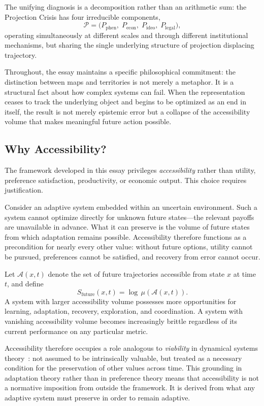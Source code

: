 \documentclass[12pt, a4paper]{article}
\theoremstyle{plain}
\theoremstyle{definition}
\theoremstyle{remark}
\begin{document}
The unifying diagnosis is a decomposition rather than an arithmetic sum: the
Projection Crisis has four irreducible components,
\[
\mathcal{P} = \bigl(P_{\mathrm{phen}},\; P_{\mathrm{econ}},\; P_{\mathrm{ideo}},\; P_{\mathrm{legal}}\bigr),
\]
operating simultaneously at different scales and through different institutional
mechanisms, but sharing the single underlying structure of projection displacing trajectory.

Throughout, the essay maintains a specific philosophical commitment:
the distinction between maps and territories is not merely a metaphor.
It is a structural fact about how complex systems can fail.
When the representation ceases to track the underlying object and begins to
be optimized as an end in itself, the result is not merely epistemic error
but a collapse of the accessibility volume that makes meaningful future action possible.

\subsection*{Why Accessibility?}

The framework developed in this essay privileges \emph{accessibility} rather than
utility, preference satisfaction, productivity, or economic output.
This choice requires justification.

Consider an adaptive system embedded within an uncertain environment.
Such a system cannot optimize directly for unknown future states---the relevant
payoffs are unavailable in advance.
What it can preserve is the volume of future states from which adaptation remains
possible.
Accessibility therefore functions as a precondition for nearly every other value:
without future options, utility cannot be pursued, preferences cannot be satisfied,
and recovery from error cannot occur.

Let $\mathcal{A}(x,t)$ denote the set of future trajectories accessible from
state $x$ at time $t$, and define
\[
S_{\mathrm{future}}(x,t) = \log\,\mu(\mathcal{A}(x,t)).
\]
A system with larger accessibility volume possesses more opportunities for learning,
adaptation, recovery, exploration, and coordination.
A system with vanishing accessibility volume becomes increasingly brittle regardless
of its current performance on any particular metric.

Accessibility therefore occupies a role analogous to \emph{viability} in dynamical
systems theory~\cite{aubin1991viability}: not assumed to be intrinsically valuable, but
treated as a necessary condition for the preservation of other values across time.
This grounding in adaptation theory rather than in preference theory means that
accessibility is not a normative imposition from outside the framework.
It is derived from what any adaptive system must preserve in order to remain adaptive.
\end{document}
